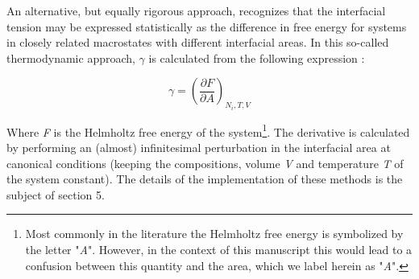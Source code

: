\documentclass{scrbook}
\begin{document}
An alternative, but equally rigorous approach, recognizes that the interfacial
tension may be expressed statistically as the difference in free energy for
systems in closely related macrostates with different interfacial areas. In
this so-called thermodynamic approach, $\gamma$ is calculated from the
following expression \citep{gray2011,gloor2005,errington2007}:

\begin{equation}
\gamma=\left(\frac{\partial F}{\partial A}\right)_{N_{i},T,V}
\end{equation}

Where \textit{F} is the Helmholtz free energy of the system\footnote{
Most commonly in the literature the Helmholtz free energy is symbolized by the
letter "\textit{A}". However, in the context of this manuscript this would lead
to a confusion between this quantity and the area, which we label herein as
"\textit{A}".}.  The derivative is calculated by performing an (almost)
infinitesimal perturbation in the interfacial area at canonical conditions
(keeping the compositions, volume \textit{V} and temperature \textit{T} of the
system constant). The details of the implementation of these methods is the
subject of section 5.
\end{document}
